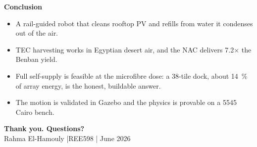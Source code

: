 \documentclass[aspectratio=169,10pt]{beamer}
\begin{document}
{
\begin{frame}[plain]
  \begin{center}
    {\Large\color{nacblue}\textbf{Conclusion}}\\[0.8em]
  \end{center}
  \begin{itemize}\setlength\itemsep{0.45em}
    \item A rail-guided robot that cleans rooftop PV and refills from water it condenses out of the air.
    \item TEC harvesting works in Egyptian desert air, and the NAC delivers 7.2$\times$ the Benban yield.
    \item Full self-supply is feasible at the microfibre dose: a 38-tile dock, about \SI{14}{\percent} of array energy, is the honest, buildable answer.
    \item The motion is validated in Gazebo and the physics is provable on a \SI{5545}{\EGP} Cairo bench.
  \end{itemize}
  \vspace{0.8em}
  \begin{center}
    {\Large\color{nacteal}\textbf{Thank you. Questions?}}\\[0.4em]
    \small Rahma El-Hamouly \quad|\quad REE598 \quad| June 2026
  \end{center}
\end{frame}}
\end{document}
